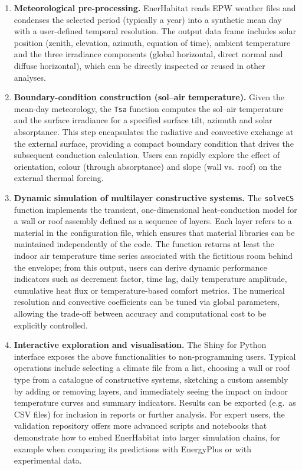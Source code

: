 \documentclass[preprint,12pt, a4paper]{elsarticle}
\begin{document}
\begin{enumerate}
  \item \textbf{Meteorological pre-processing.} EnerHabitat reads EPW weather files and condenses the selected period (typically a year) into a synthetic mean day with a user-defined temporal resolution. The output data frame includes solar position (zenith, elevation, azimuth, equation of time), ambient temperature and the three irradiance components (global horizontal, direct normal and diffuse horizontal), which can be directly inspected or reused in other analyses.

  \item \textbf{Boundary-condition construction (sol--air temperature).} Given the mean-day meteorology, the \texttt{Tsa} function computes the sol--air temperature and the surface irradiance for a specified surface tilt, azimuth and solar absorptance. This step encapsulates the radiative and convective exchange at the external surface, providing a compact boundary condition that drives the subsequent conduction calculation. Users can rapidly explore the effect of orientation, colour (through absorptance) and slope (wall vs.\ roof) on the external thermal forcing.

  \item \textbf{Dynamic simulation of multilayer constructive systems.} The \texttt{solveCS} function implements the transient, one-dimensional heat-conduction model for a wall or roof assembly defined as a sequence of layers. Each layer refers to a material in the configuration file, which ensures that material libraries can be maintained independently of the code. The function returns at least the indoor air temperature time series associated with the fictitious room behind the envelope; from this output, users can derive dynamic performance indicators such as decrement factor, time lag, daily temperature amplitude, cumulative heat flux or temperature-based comfort metrics. The numerical resolution and convective coefficients can be tuned via global parameters, allowing the trade-off between accuracy and computational cost to be explicitly controlled.

  \item \textbf{Interactive exploration and visualisation.} The Shiny for Python interface exposes the above functionalities to non-programming users. Typical operations include selecting a climate file from a list, choosing a wall or roof type from a catalogue of constructive systems, sketching a custom assembly by adding or removing layers, and immediately seeing the impact on indoor temperature curves and summary indicators. Results can be exported (e.g.\ as CSV files) for inclusion in reports or further analysis. For expert users, the validation repository offers more advanced scripts and notebooks that demonstrate how to embed EnerHabitat into larger simulation chains, for example when comparing its predictions with EnergyPlus or with experimental data.
\end{enumerate}
\end{document}
